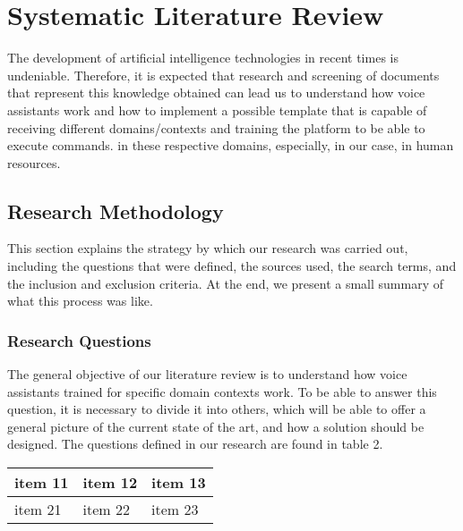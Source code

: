 \chapter{Systematic Literature Review}

\label{chapter:systematic_review}

\newcommand{\RQI}{What are the main artificial intelligence and machine learning technologies related to voice user interfaces, specially in Speech Recognition, Speech Synthesis, Natural Language Processing, and Trigger-word detection?}

\newcommand{\RQII}{What is the state-of-the-art and the main services that exist in the market on Voice User Interfaces?}

\newcommand{\RQIII}{oioi}

The development of artificial intelligence technologies in recent times is undeniable. Therefore, it is expected that research and screening of documents that represent this knowledge obtained can lead us to understand how voice assistants work and how to implement a possible template that is capable of receiving different domains/contexts and training the platform to be able to execute commands. in these respective domains, especially, in our case, in human resources.

\section{Research Methodology}

This section explains the strategy by which our research was carried out, including the questions that were defined, the sources used, the search terms, and the inclusion and exclusion criteria. At the end, we present a small summary of what this process was like.

\subsection{Research Questions}

The general objective of our literature review is to understand how voice assistants trained for specific domain contexts work. To be able to answer this question, it is necessary to divide it into others, which will be able to offer a general picture of the current state of the art, and how a solution should be designed. The questions defined in our research are found in table 2.

\begin{tabularx}{0.8\textwidth} {
    | >{\raggedright\arraybackslash}X 
    | >{\centering\arraybackslash}X 
    | >{\raggedleft\arraybackslash}X |}
    \hline
    item 11 & item 12 & item 13 \\
    \hline
    item 21  & item 22  & item 23  \\
    \hline
\end{tabularx}


